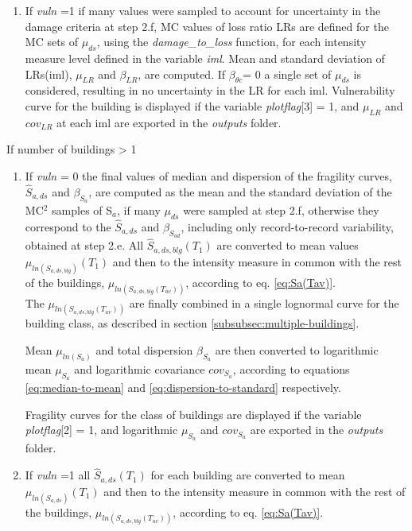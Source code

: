 \begin{enumerate}
\begin{enumerate}
\item 
If \textit{vuln} =1 if many values were sampled to account for uncertainty in the damage criteria at step 2.f, MC values of loss ratio LRs are defined for the MC sets of $\mu_{ds}$, using the \textit{damage\_to\_loss} function, for each intensity measure level defined in the variable \textit{iml}. Mean and standard deviation of LRs(iml), $\mu_{LR}$ and $\beta_{LR}$, are computed. If $\beta_{\theta c}$= 0 a single set of $\mu_{ds}$ is considered, resulting in no uncertainty in the LR for each iml.
Vulnerability curve for the building is displayed if the variable \textit{plotflag}[3] = 1, and $\mu_{LR}$ and $cov_{LR}$ at each iml are exported in the \textit{outputs} folder.\\

\end{enumerate}

If number of buildings > 1\\
\begin{enumerate}
\item If \textit{vuln} = 0
the final values of median and dispersion of the fragility curves, $\hat{S}_{a,ds}$ and $\beta_{S_a}$, are computed as the mean and the standard deviation of the MC$^2$ samples of S$_a$, if many $\mu_{ds}$ were sampled at step 2.f, otherwise they correspond to the $\hat{S}_{a,ds}$ and $\beta_{S_{a d}}$, including only record-to-record variability, obtained at step 2.e.
All $\hat{S}_{a, ds, blg}(T_1)$ are converted to mean values $\mu_{ln(S_{a, ds, blg})}(T_1)$ and then to the intensity measure in common with the rest of the buildings, $\mu_{ln(S_{a, ds, blg}(T_{av}))}$, according to eq. \ref{eq:Sa(Tav)}.\\
The $\mu_{ln(S_{a, ds, blg}(T_{av}))}$ are finally combined in a single lognormal curve for the building class, as described in section \ref{subsubsec:multiple-buildings}. 

Mean $\mu_{ln(S_{a})}$ and total dispersion $\beta_{S_a}$ are then converted to logarithmic mean $\mu_{S_a}$ and logarithmic covariance $cov_{S_a}$, according to equations \ref{eq:median-to-mean} and \ref{eq:dispersion-to-standard} respectively.

Fragility curves for the class of buildings are displayed if the variable \textit{plotflag}[2] = 1, and logarithmic $\mu_{S_a}$ and $cov_{S_a}$ are exported in the \textit{outputs} folder.

\item If \textit{vuln} =1
all $\hat{S}_{a, ds}(T_1)$ for each building are converted to mean $\mu_{ln(S_{a, ds})}(T_1)$ and then to the intensity measure in common with the rest of the buildings, $\mu_{ln(S_{a, ds, blg}(T_{av}))}$, according to eq. \ref{eq:Sa(Tav)}.


\end{enumerate}
\end{enumerate}
